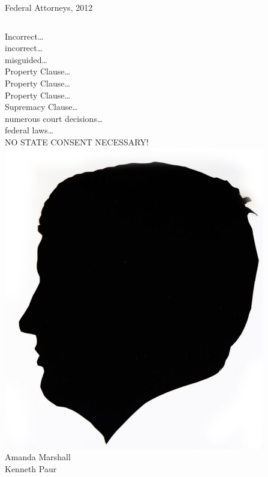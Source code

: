 \begin{frame}{Federal Attorneys, 2012}
    \begin{columns}[c]
            \centering
            Incorrect\ldots \\
            incorrect\ldots \\
            misguided\ldots \\
            Property Clause\ldots \\
            Property Clause\ldots \\
            Property Clause\ldots \\
            Supremacy Clause\ldots \\
            numerous court decisions\ldots \\
            federal laws\ldots \\
            NO STATE CONSENT NECESSARY! \\
            \centering
            \includegraphics[height=0.5\textheight]{img/elmer-dickens.png} \\
            Amanda Marshall \\
            Kenneth Paur \\
    \end{columns}
\end{frame}

